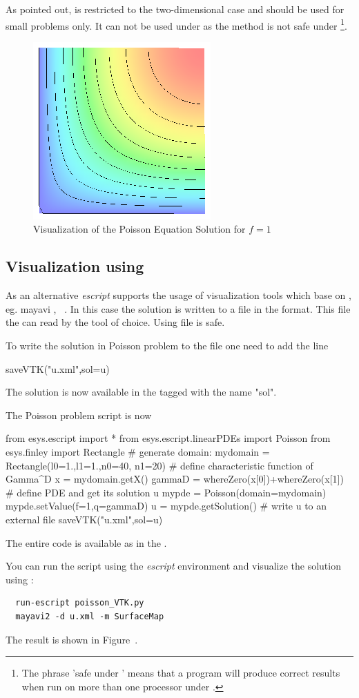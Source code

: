 As pointed out, \MATPLOTLIB is restricted to the two-dimensional case and 
should be used for small problems only. It can not be used under \MPI as the  method is
not safe under \MPI\footnote{The phrase 'safe under \MPI' means that a program will produce correct results when run on more than one processor under \MPI.}.

\begin{figure}
\centerline{\includegraphics[width=\figwidth]{figures/FirstStepResult}}
\caption{Visualization of the Poisson Equation Solution for $f=1$}
\label{fig:FirstSteps.3}
\end{figure}

\subsection{Visualization using \VTK}

As an alternative {\it escript} supports the usage of visualization tools which base on \VTK, eg. mayavi \cite{mayavi}, \VisIt~\cite{VisIt}. In this case the solution is written to a file in the \VTK format. This file the can read by the tool of choice. Using \VTK file is \MPI safe.

To write the solution  in  Poisson problem to the file  one need to add the line
\begin{python}
saveVTK("u.xml",sol=u)
\end{python}
The solution  is now available in the  tagged with the name "sol". 

The Poisson problem script is now 
\begin{python}
  from esys.escript import *
  from esys.escript.linearPDEs import Poisson
  from esys.finley import Rectangle
  # generate domain:
  mydomain = Rectangle(l0=1.,l1=1.,n0=40, n1=20)
  # define characteristic function of Gamma^D
  x = mydomain.getX()
  gammaD = whereZero(x[0])+whereZero(x[1])
  # define PDE and get its solution u
  mypde = Poisson(domain=mydomain)
  mypde.setValue(f=1,q=gammaD)
  u = mypde.getSolution()
  # write u to an external file
  saveVTK("u.xml",sol=u)
\end{python}
The entire code is available as  in the \ExampleDirectory.

You can run the script using the {\it escript} environment
and visualize the solution using \mayavi:
\begin{verbatim}
  run-escript poisson_VTK.py
  mayavi2 -d u.xml -m SurfaceMap
\end{verbatim}
The result is shown in Figure~. 
